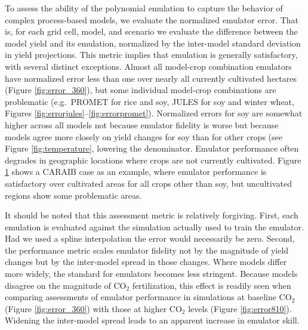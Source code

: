 \documentclass[preprint, 5p, times, twocolumn]{elsarticle}
\begin{document}
\begin{figure}[!p]
   \label{fig:error}
\end{figure}

To assess the ability of the polynomial emulation to capture the behavior of complex process-based models, we evaluate the normalized emulator error. That is, for each grid cell, model, and scenario we evaluate the difference between the model yield and its emulation, normalized by the inter-model standard deviation in yield projections. This metric implies that emulation is generally satisfactory, with several distinct exceptions. Almost all model-crop combination emulators have normalized error less than one over nearly all currently cultivated hectares (Figure \ref{fig:error_360}), but some individual model-crop combinations are problematic (e.g.\ PROMET for rice and soy, JULES for soy and winter wheat, Figures \ref{fig:errorjules}--\ref{fig:errorpromet}). Normalized errors for soy are somewhat higher across all models not because emulator fidelity is worse but because models agree more closely on yield changes for soy than for other crops (see Figure \ref{fig:temperature}, lowering the denominator. Emulator performance often degrades in geographic locations where crops are not currently cultivated. Figure \ref{fig:error} shows a CARAIB case as an example, where emulator performance is satisfactory over cultivated areas for all crops other than soy, but uncultivated regions show some problematic areas. 

It should be noted that this assessment metric is relatively forgiving. First, each emulation is evaluated against the simulation actually used to train the emulator. Had we used a spline interpolation the error would necessarily be zero. Second, the performance metric scales emulator fidelity not by the magnitude of yield changes but by the inter-model spread in those changes. Where models differ more widely, the standard for emulators becomes less stringent. Because models disagree on the magnitude of CO$_2$ fertilization, this effect is readily seen when comparing assessments of emulator performance in simulations at  baseline CO$_2$ (Figure \ref{fig:error_360}) with those at higher CO$_2$ levels (Figure \ref{fig:error810}). Widening the inter-model spread leads to an apparent increase in emulator skill.
\end{document}
